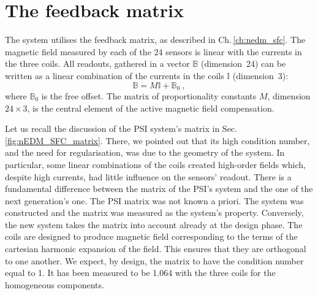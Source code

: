\section{The feedback matrix}
The system utilises the feedback matrix, as described in Ch.\,\ref{ch:nedm_sfc}. The magnetic field measured by each of the 24 sensors is linear with the currents in the three coils. All readouts, gathered in a vector $\mathbb{B}$ (dimension~24) can be written as a linear combination of the currents in the coils $\mathbb{I}$ (dimension~3):
\begin{equation}
  \label{eq:SFC_matrix_model}
  \mathbb{B} = M \mathbb{I} + \mathbb{B}_0 \ ,
\end{equation}
where $\mathbb{B}_0$ is the free offset. The matrix of proportionality constants $M$, dimension $24 \times 3$, is the central element of the active magnetic field compensation.

Let us recall the discussion of the PSI system's matrix in Sec.\,\ref{fig:nEDM_SFC_matrix}. There, we pointed out that its high condition number, and the need for regularisation, was due to the geometry of the system. In particular, some linear combinations of the coils created high-order fields which, despite high currents, had little influence on the sensors' readout.
There is a fundamental difference between the matrix of the PSI's system and the one of the next generation's one. The PSI matrix was not known a priori. The system was constructed and the matrix was measured as the system's property.
Conversely, the new system takes the matrix into account already at the design phase. The coils are designed to produce magnetic field corresponding to the terms of the cartesian harmonic expansion of the field.
This ensures that they are orthogonal to one another. We expect, by design, the matrix to have the condition number equal to \num{1}. It has been measured to be \num{1.064} with the three coils for the homogeneous components.


